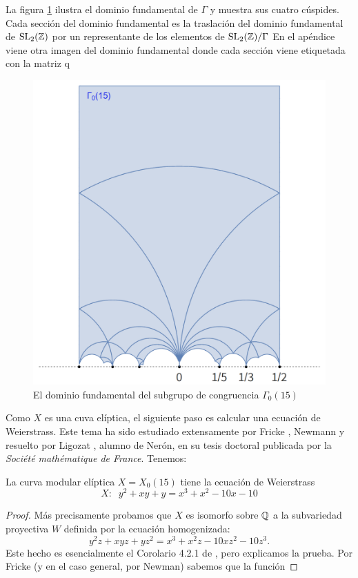 \documentclass[../../tesis_maestria]{subfiles}
\begin{document}
La figura \ref{fig:domfunGamma15} ilustra el dominio fundamental de $\Gamma$ y muestra sus
cuatro c\'uspides. Cada secci\'on del dominio fundamental es la traslaci\'on del dominio
fundamental de $\mathrm{SL}_2(\mathbb{Z})$ por un representante de los elementos de $\mathrm{SL}_2(\mathbb{Z})/\Gamma$
En el ap\'endice viene otra imagen del dominio fundamental donde cada secci\'on viene
etiquetada con la matriz q

\begin{figure}[!h]%
  \centering
  \includegraphics[scale=0.25]{figuras/domfundgamma015}
  \caption{El dominio fundamental del subgrupo de congruencia $\Gamma_0(15)$}
  \label{fig:domfunGamma15}
\end{figure}%

Como $X$ es una cuva el\'iptica, el siguiente paso es calcular una ecuaci\'on de Weierstrass.
Este tema ha sido estudiado extensamente por Fricke \cite{Fricke}, Newmann \cite{NewmanCAAOACOMFII}
y resuelto por Ligozat \cite{LigozatCMDG1}, alumno de Ner\'on, en su tesis doctoral publicada por la
\emph{Soci\'et\'e math\'ematique de France}. Tenemos:

\begin{prop}
  La curva modular el\'iptica $X=X_0(15)$ tiene la ecuaci\'on de Weierstrass
  \[
    X:\;\; y^2+xy+y=x^3+x^2-10x-10
  \]
\end{prop}
\begin{proof}
  M\'as precisamente probamos que $X$ es isomorfo sobre $\mathbb{Q}$ a la subvariedad proyectiva $W$
  definida por la ecuaci\'on homogenizada:
  \[
    y^2z+xyz+yz^2=x^3+x^2z-10xz^2-10z^3.
  \]
  Este hecho es esencialmente el Corolario 4.2.1 de \cite{LigozatCMDG1}, pero explicamos la prueba.
  Por Fricke (y en el caso general, por Newman) sabemos que la funci\'on
\end{proof}
\end{document}
